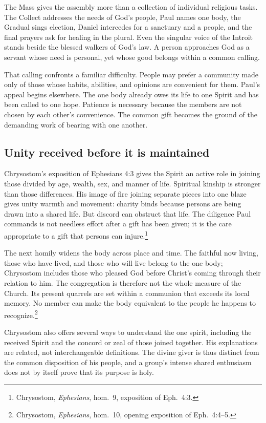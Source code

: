 
The Mass gives the assembly more than a collection of individual religious tasks. The Collect addresses the needs of God's people, Paul names one body, the Gradual sings election, Daniel intercedes for a sanctuary and a people, and the final prayers ask for healing in the plural. Even the singular voice of the Introit stands beside the blessed walkers of God's law. A person approaches God as a servant whose need is personal, yet whose good belongs within a common calling.

That calling confronts a familiar difficulty. People may prefer a community made only of those whose habits, abilities, and opinions are convenient for them. Paul's appeal begins elsewhere. The one body already owes its life to one Spirit and has been called to one hope. Patience is necessary because the members are not chosen by each other's convenience. The common gift becomes the ground of the demanding work of bearing with one another.

\subsection{Unity received before it is maintained}
Chrysostom's exposition of Ephesians 4:3 gives the Spirit an active role in joining those divided by age, wealth, sex, and manner of life. Spiritual kinship is stronger than those differences. His image of fire joining separate pieces into one blaze gives unity warmth and movement: charity binds because persons are being drawn into a shared life. But discord can obstruct that life. The diligence Paul commands is not needless effort after a gift has been given; it is the care appropriate to a gift that persons can injure.\footnote{Chrysostom, \textit{Ephesians}, hom.~9, exposition of Eph.~4:3.}

The next homily widens the body across place and time. The faithful now living, those who have lived, and those who will live belong to the one body; Chrysostom includes those who pleased God before Christ's coming through their relation to him. The congregation is therefore not the whole measure of the Church. Its present quarrels are set within a communion that exceeds its local memory. No member can make the body equivalent to the people he happens to recognize.\footnote{Chrysostom, \textit{Ephesians}, hom.~10, opening exposition of Eph.~4:4--5.}

Chrysostom also offers several ways to understand the one spirit, including the received Spirit and the concord or zeal of those joined together. His explanations are related, not interchangeable definitions. The divine giver is thus distinct from the common disposition of his people, and a group's intense shared enthusiasm does not by itself prove that its purpose is holy.

